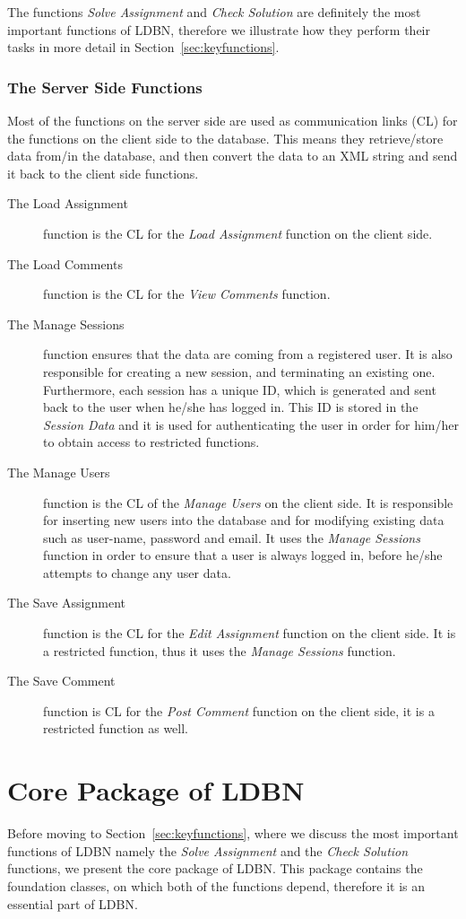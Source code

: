 The functions \textit{Solve Assignment} and \textit{Check Solution} are definitely the most 
important functions of LDBN, therefore we illustrate how they perform their tasks
in more detail in Section~\ref{sec:keyfunctions}. 

\subsubsection{The Server Side Functions}
Most of the functions on the server side are used as communication links (CL) for the
functions on the client side to the database. This means they retrieve/store data from/in the 
database, and then convert the data to an XML string and send it back to the client side
functions. 

\begin{description}
	\item[The Load Assignment] function is the CL for the \textit{Load Assignment} function on the 
		client side.
	\item[The Load Comments] function is the CL for the \textit{View Comments} function.
	\item[The Manage Sessions] function ensures that the data are coming from a registered user.
		It is also responsible for creating a new session, and terminating an existing one. Furthermore,
		each session has a unique ID, which is generated and sent back to the user 
		when he/she has logged in. This ID is stored in the \textit{Session Data} and it is used for
		authenticating the user in order for him/her to obtain access to restricted functions.
	\item[The Manage Users] function is the CL of the \textit{Manage Users} on the client side.
		It is responsible 
		for inserting new users into the database and for modifying existing data such as 
		user-name, password and email.
		It uses the \textit{Manage Sessions} function in order to ensure that a
		user is always logged in, before he/she attempts to change any user data.  
	\item[The Save Assignment] function is the CL for the \textit{Edit Assignment} function on the client side. 
		It is a restricted function, thus it uses the \textit{Manage Sessions} function. 
	\item[The Save Comment] function is CL for the \textit{Post Comment} function on the client side, it is 
		a restricted function as well.
\end{description} 

\section{Core Package of LDBN}
\label{sec:corepk}
Before moving to Section~\ref{sec:keyfunctions}, where we discuss the most important functions of 
LDBN namely the \textit{Solve Assignment} and the \textit{Check Solution} functions, 
we present the core package of LDBN. This package contains the foundation 
classes, on which both of the functions depend, therefore it is an essential 
part of LDBN. 

